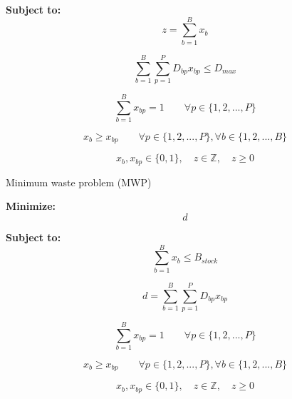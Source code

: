 \documentclass[12pt,a4paper,spanish]{article}
\begin{document}
\textbf{Subject to:}
\begin{equation}
\label{eq:totalBobinas}
z=\sum_{b=1}^B{x_b}
\end{equation}

\bigskip
\begin{equation}
\sum_{b=1}^B{\sum_{p=1}^P{D_{bp} x_{bp}}} \leq D_{max}
\label{eq:despTotal}
\end{equation}

\begin{equation}
\sum_{b=1}^B{x_{bp}} = 1 \quad \quad   \forall p \in \{1,2,...,P\}
\label{eq:asign}
\end{equation}

\begin{equation}
x_b \geq x_{bp} \quad \quad   \forall p \in \{1,2,...,P\}, \forall b \in \{1,2,...,B\}
\label{eq:bobinaUso}
\end{equation}

\begin{equation}
	x_b,x_{bp} \in \{0,1\}, \quad z \in \mathbb{Z}, \quad z \geq 0 
\end{equation}


\newpage
\begin{center}
\large{Minimum waste problem (MWP)}
\end{center}

\textbf{Minimize:}
\begin{equation}
d
\label{eq_obj}
\end{equation}
\bigskip


\textbf{Subject to:}
\begin{equation}
\label{eq:totalBobinas}
\sum_{b=1}^B{x_b} \leq B_{stock}
\end{equation}

\bigskip
\begin{equation}
d = \sum_{b=1}^B{\sum_{p=1}^P{D_{bp} x_{bp}}}
\label{eq:despTotal}
\end{equation}

\begin{equation}
\sum_{b=1}^B{x_{bp}} = 1 \quad \quad   \forall p \in \{1,2,...,P\}
\label{eq:asign}
\end{equation}

\begin{equation}
x_b \geq x_{bp} \quad \quad   \forall p \in \{1,2,...,P\}, \forall b \in \{1,2,...,B\}
\label{eq:bobinaUso}
\end{equation}

\begin{equation}
	x_b,x_{bp} \in \{0,1\}, \quad z \in \mathbb{Z}, \quad z \geq 0 
\end{equation}
\end{document}
